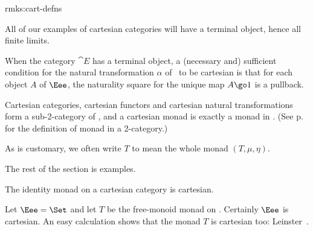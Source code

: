 \begin{remarks}{rmks:cart-defns}
\item All of our examples of cartesian categories will have a terminal%
%
%
object, hence all finite limits.
\item When the category $\cat{E}$ has a terminal object, a (necessary and)
sufficient condition for the natural transformation $\alpha$
of~ to be cartesian is that for each object $A$ of
$\Eee$, the naturality square for the unique map $A \go 1$ is a pullback.  
\item Cartesian categories, cartesian functors and cartesian natural
transformations form a sub-2-category  of \Cat, and a
cartesian monad is exactly a monad in .  (See
p.~\pageref{p:defn-monad-in-bicaty} for the definition of monad in a
2-category.)
\item As is customary, we often write $T$ to mean the whole monad
$(T,\mu,\eta)$. 
\end{remarks}

The rest of the section is examples.

\begin{example}
The identity monad on a cartesian category is cartesian.
\end{example}

\begin{example}		
Let $\Eee = \Set$ and let $T$ be the free-monoid%
%
%
monad on \Eee.  Certainly
$\Eee$ is cartesian.  An easy calculation shows that the monad $T$ is
cartesian too: Leinster~\cite[1.4(ii)]{GOM}.
\end{example}

